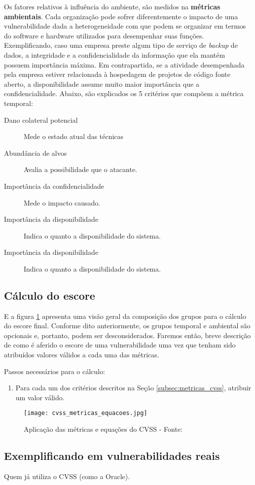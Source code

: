 			Os fatores relativos à influência do ambiente, são medidos na \textbf{métricas
			ambientais}. Cada organização pode sofrer diferentemente o impacto de uma
			vulnerabilidade dada a heterogeneidade com que podem se organizar em termos
			do software e hardware utilizados para desempenhar suas funções.
			Exemplificando, caso uma empresa preste algum tipo de serviço de \textsl{backup} de
			dados, a integridade e a confidencialidade da informação que ela mantém
			possuem importância máxima. Em contrapartida, se a atividade desempenhada pela
			empresa estiver relacionada à hospedagem de projetos de código fonte aberto,
			a disponibilidade assume muito maior importância que a confidencialidade.
			Abaixo, são explicados os 5 critérios que compõem a métrica temporal:
			\begin{description}
				\item[Dano colateral potencial]{Mede o estado atual das técnicas}
				\item[Abundância de alvos]{Avalia a possibilidade que o atacante.}
				\item[Importância da confidencialidade]{Mede o impacto causado.}
				\item[Importância da disponibilidade]{Indica o quanto a disponibilidade do sistema.}
				\item[Importância da disponibilidade]{Indica o quanto a disponibilidade do sistema.}
			\end{description}
		

		\subsection{Cálculo do escore}
			E a figura \ref{fig:cvss_metricas_equacoes} apresenta uma visão geral da composição
			dos grupos para o cálculo do escore final. Conforme dito anteriormente,
			os grupos temporal e ambiental são opcionais e, portanto, podem
			ser desconsiderados. Faremos então, breve descrição de como é aferido
			o escore de uma vulnerabilidade uma vez que tenham sido atribuídos
			valores válidos a cada uma das métricas.


			Passos necessários para o cálculo:
			\begin{enumerate}
				\item{Para cada um dos critérios descritos na Seção \ref{subsec:metricas_cvss},
					atribuir um valor válido.}
			\end{enumerate}
			

			\begin{figure}
				\begin{center}
					\texttt{[image: cvss\_metricas\_equacoes.jpg]}
					\caption{Aplicação das métricas e equações do CVSS - Fonte: \cite{Mell2007}}
					\label{fig:cvss_metricas_equacoes}
				\end{center}
			\end{figure}



		\subsection{Exemplificando em vulnerabilidades reais}
			Quem já utiliza o CVSS (como a Oracle).
			

